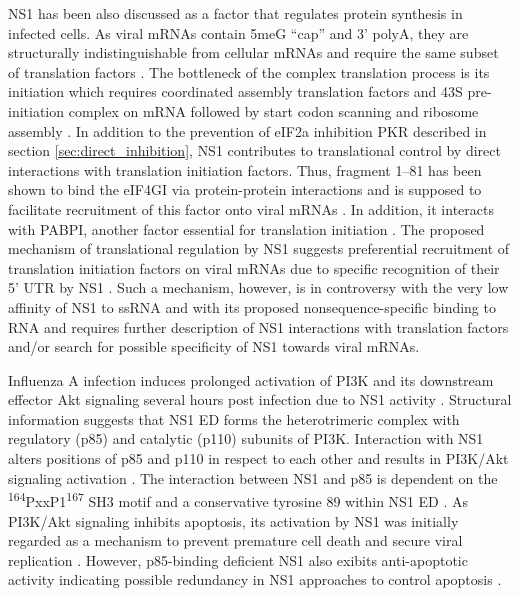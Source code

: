 		\gls{NS1} has been also discussed as a factor that regulates protein synthesis in infected cells. As viral mRNAs contain \gls{5meG} ``cap'' and 3' \gls{polyA}, they are structurally indistinguishable from cellular mRNAs and require the same subset of translation factors \parencite{Poch1989, Poon1999}. The bottleneck of the complex translation process is its initiation which requires coordinated assembly translation factors and 43S pre-initiation complex on mRNA followed by start codon scanning and ribosome assembly \parencite{Pestova2001}. In addition to the prevention of \gls{eIF2a} inhibition \gls{PKR} described in section \ref{sec:direct_inhibition}, \gls{NS1} contributes to translational control by direct interactions with translation initiation factors. Thus, fragment 1--81 has been shown to bind the \gls{eIF4GI} via protein-protein interactions and is supposed to facilitate recruitment of this factor onto viral mRNAs \parencite{Aragon2000}. In addition, it interacts with \gls{PABP}I, another factor essential for translation initiation \parencite{Burgui2003}. The proposed mechanism of translational regulation by \gls{NS1} suggests preferential recruitment of translation initiation factors on viral mRNAs due to specific recognition of their 5' \gls{UTR} by NS1 \parencite{DelaLuna1995}. Such a mechanism, however, is in controversy with the very low affinity of NS1 to ssRNA and with its proposed nonsequence-specific binding to RNA \parencite{Hatada1992} and requires further description of NS1 interactions with translation factors and/or search for possible specificity of NS1 towards viral mRNAs.
	
		Influenza A infection induces prolonged activation of \gls{PI3K} and its downstream effector Akt signaling several hours post infection due to \gls{NS1} activity \parencite{Ehrhardt2006, Ehrhardt2009}. Structural information suggests that \gls{NS1} \gls{ED} forms the heterotrimeric complex with regulatory (p85) and catalytic (p110) subunits of \gls{PI3K}. Interaction with NS1 alters positions of p85 and p110 in respect to each other and results in \gls{PI3K}/Akt signaling activation \parencite{Hale2008d, Hale2010c}. The interaction between \gls{NS1} and p85 is dependent on the \textsuperscript{164}PxxP1\textsuperscript{167} \gls{SH3} motif and a conservative tyrosine 89 within \gls{NS1} \gls{ED} \parencite{Hale2006, Shin2007a, Shin2007}. As \gls{PI3K}/Akt signaling inhibits apoptosis, its activation by \gls{NS1} was initially regarded as a mechanism to prevent premature cell death and secure viral replication \parencite{Ehrhardt2007, Zhirnov2007}. However, p85-binding deficient \gls{NS1} also exibits anti-apoptotic activity indicating possible redundancy in NS1 approaches to control apoptosis \parencite{Jackson2010a}.
		
